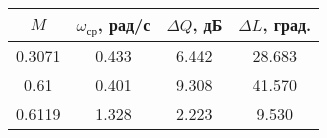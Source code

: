 \begin{tabular}{|c|c|c|c|}
\hline
   $M$ &  $\omega_{ср}$, рад/с &  $\Delta Q$, дБ &  $\Delta L$, град. \\
\hline
0.3071 &                 0.433 &           6.442 &             28.683 \\
  0.61 &                 0.401 &           9.308 &             41.570 \\
0.6119 &                 1.328 &           2.223 &              9.530 \\
\hline
\end{tabular}
